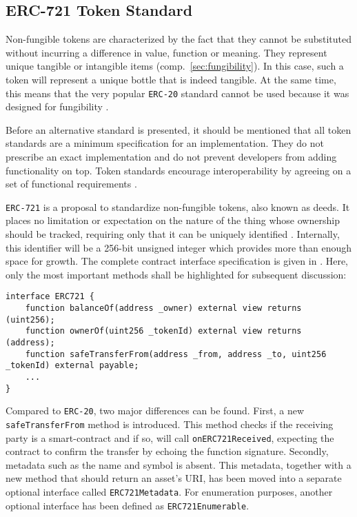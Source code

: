 \subsection{ERC-721 Token Standard}
Non-fungible tokens are characterized by the fact that they cannot be substituted without incurring a difference in value, function or meaning. They represent unique tangible or intangible items (comp.~\ref{sec:fungibility}). In this case, such a token will represent a unique bottle that is indeed tangible. At the same time, this means that the very popular \texttt{\acs{ERC}-20} standard cannot be used because it was designed for fungibility \cite{erc20}. 

Before an alternative standard is presented, it should be mentioned that all token standards are a minimum specification for an implementation. They do not prescribe an exact implementation and do not prevent developers from adding functionality on top. Token standards encourage interoperability by agreeing on a set of functional requirements \cite[pp.~198--199]{Antonopoulos.2018}. 

\texttt{\acs{ERC}-721} is a proposal to standardize non-fungible tokens, also known as deeds. It places no limitation or expectation on the nature of the thing whose ownership should be tracked, requiring only that it can be uniquely identified \cite[p.~197]{Antonopoulos.2018}. Internally, this identifier will be a 256-bit unsigned integer which provides more than enough space for growth. The complete contract interface specification is given in \cite{erc721}. Here, only the most important methods shall be highlighted for subsequent discussion:

\begin{lstlisting}[language=Solidity, caption=ERC-721 contract interface specification, label=lst:erc721]
interface ERC721 {
    function balanceOf(address _owner) external view returns (uint256);
    function ownerOf(uint256 _tokenId) external view returns (address);
    function safeTransferFrom(address _from, address _to, uint256 _tokenId) external payable;
    ...
}
\end{lstlisting}
 
Compared to \texttt{\acs{ERC}-20}, two major differences can be found. First, a new \texttt{safeTransferFrom} method is introduced. This method checks if the receiving party is a smart-contract and if so, will call \texttt{onERC721Received}, expecting the contract to confirm the transfer by echoing the function signature. Secondly, metadata such as the name and symbol is absent. This metadata, together with a new method that should return an asset's URI, has been moved into a separate optional interface called \texttt{ERC721Metadata}. For enumeration purposes, another optional interface has been defined as  \texttt{ERC721Enumerable}.

